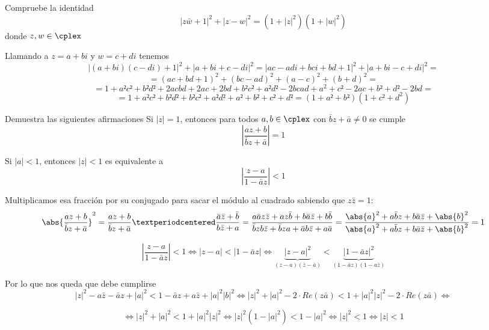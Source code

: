 \begin{problem}[4]
Compruebe la identidad
\[|z\bar{w}+1|^2+|z-w|^2 = (1+|z|^2)(1+|w|^2)\]
donde $z,w \in \cplex$

\solution

Llamando a $z=a+bi$ y $w=c+di$ tenemos
\[|(a+bi)(c-di)+1|^2+|a+bi+c-di|^2=|ac-adi+bci+bd+1|^2+|a+bi-c+di|^2 = \]
\[=(ac+bd+1)^2+(bc-ad)^2+(a-c)^2+(b+d)^2 =\]
\[= 1 + a²c²+b²d²+2acbd + 2ac+2bd+b²c²+a²d²-2bcad+a^2+c²-2ac+b²+d²-2bd =\]
\[= 1+a²c²+b²d²+b²c²+a²d²+a²+b²+c²+d² = (1+a²+b²)(1+c²+d^2)\]

\end{problem}

\begin{problem}[5]
Demuestra las siguientes afirmaciones
\ppart Si $|z|=1$, entonces para todos $a,b \in \cplex$ con $\bar{b}z+\bar{a} \neq 0$ se cumple \[ \left| \frac{az+b}{\bar{b}z+\bar{a}}\right| = 1\]

\ppart Si $|a| < 1$, entonces $|z| <1$ es equivalente a \[ \left| \frac{z-a}{1-\bar{a}z}\right|<1\]

\solution

\spart


Multiplicamos esa fracción por su conjugado para sacar el módulo al cuadrado sabiendo que $z\bar{z} = 1$:
\[
	\abs{\frac{az+b}{\bar{b}z+\bar{a}}}^2 = \frac{az+b}{\bar{b}z+\bar{a}} · \frac{\bar{a}\bar{z}+\bar{b}}{b\bar{z}+a} =
	\frac{a\bar{a}z\bar{z} + az\bar{b} + b\bar{a}\bar{z} + b\bar{b}}{\bar{b}zb\bar{z} + \bar{b}za + \bar{a}b\bar{z} + a\bar{a}} = \frac{\abs{a}^2 + a\bar{b} z + b\bar{a}\bar{z} + \abs{b}^2}{\abs{a}^2 + a\bar{b} z + b\bar{a}\bar{z} + \abs{b}^2} = 1
\]

\spart

\[\left| \frac{z-a}{1-\bar{a}z}\right|<1 \iff |z-a| < |1-\bar{a}z| \iff \underbrace{|z-a|^2}_{(z-a)(\bar{z}-\bar{a})} < \underbrace{|1-\bar{a}z|^2}_{(1-\bar{a}z)(1-a\bar{z})} \]

Por lo que nos queda que debe cumplirse
\[|z|^2-a\bar{z}-\bar{a}z+|a|^2 < 1-\bar{a}z+a\bar{z}+|a|^2|b|^2 \iff |z|^2+|a|^2-2\cdot Re(z\bar{a}) < 1 + |a|^2|z|^2-2\cdot Re(z\bar{a}) \iff\]

\[\iff |z|^2 + |a|^2 < 1 +|a|^2|z|^2 \iff |z|^2(1-|a|^2) < 1 - |a|^2 \iff |z|^2 < 1 \iff |z| < 1\]

\end{problem}

